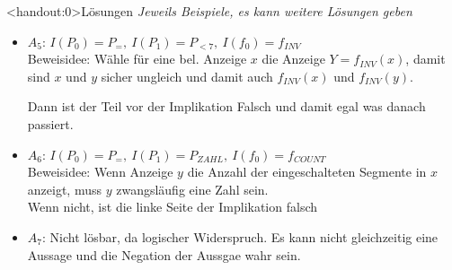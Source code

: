 {\begin{frame}<handout:0>{Lösungen}
	\textit{Jeweils Beispiele, es kann weitere Lösungen geben}
	\begin{itemize}[<+- | alert@+>]
		\item $A_5$: $I(P_0) = P_=,\ I(P_1) = P_{< 7},\ I(f_0) = f_{INV}$ \\
		      Beweisidee: Wähle für eine bel. Anzeige $x$ die Anzeige $Y=f_{INV}(x)$, damit sind $x$ und $y$ sicher ungleich und damit auch $f_{INV}(x)$ und $f_{INV}(y)$.

		      Dann ist der Teil vor der Implikation Falsch und damit egal was danach passiert.
		\item $A_6$: $I(P_0) = P_=,\ I(P_1) = P_{ZAHL},\ I(f_0) = f_{COUNT}$ \\
		      Beweisidee: Wenn Anzeige $y$ die Anzahl der eingeschalteten Segmente in $x$ anzeigt, muss $y$ zwangsläufig eine Zahl sein.\\
		      Wenn nicht, ist die linke Seite der Implikation falsch
		\item $A_7$: Nicht lösbar, da logischer Widerspruch. Es kann nicht gleichzeitig eine Aussage und die Negation der Aussgae wahr sein.
	\end{itemize}
\end{frame}
}